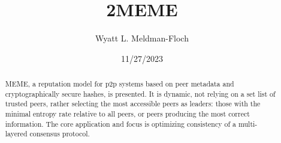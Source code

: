\documentclass{article}
\title{2MEME}
\author{Wyatt L. Meldman-Floch}
\date{11/27/2023}
\begin{document}
\maketitle

\begin{abstract}
MEME, a reputation model for p2p systems based on peer metadata and cryptographically secure hashes, is presented. It is dynamic, not relying on a set list of trusted peers, rather selecting the most accessible peers as leaders: those with the minimal entropy rate relative to all peers, or peers producing the most correct information. The core application and focus is optimizing consistency of a multi-layered consensus protocol. 

\end{abstract}

\tableofcontents

\setcounter{secnumdepth}{0}
\end{document}
